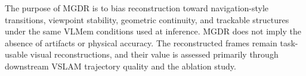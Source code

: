 The purpose of MGDR is to bias reconstruction toward navigation-style transitions, viewpoint stability, geometric continuity, and trackable structures under the same VLMem conditions used at inference. MGDR does not imply the absence of artifacts or physical accuracy. The reconstructed frames remain task-usable visual reconstructions, and their value is assessed primarily through downstream VSLAM trajectory quality and the ablation study.
